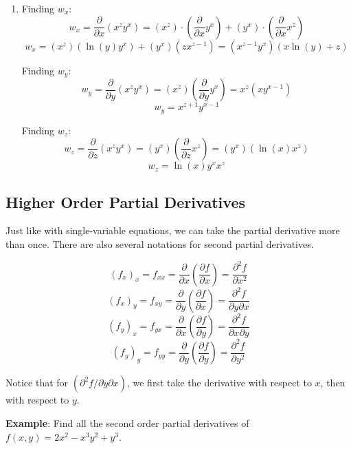 \begin{Answer}[ref = three]
\begin{enumerate}
    \item Finding $w_x$:
    $$w_x = \frac{\partial}{\partial x} \left( x^z y^x \right) = \left( x^z 
    \right) \cdot \left( \frac{\partial}{\partial x} y^x \right) + \left( y^x 
    \right) \cdot \left( \frac{\partial}{\partial x} x^z \right)$$
    $$w_x = \left(x^z \right) \left( \ln{ \left( y \right)} y^x \right) + 
    \left( y^x \right) \left(zx^{z-1} \right) = \left(x^{z-1} y^x \right) 
    \left( x\ln{\left( y \right)} + z \right)$$

    Finding $w_y$:
    $$w_y = \frac{\partial}{\partial y} \left(x^z y^x \right) = \left( x^z 
    \right) \left( \frac{\partial}{\partial y} y^x \right) = x^z \left( xy^{
    x - 1} \right)$$
    $$w_y = x^{z + 1} y^{x - 1}$$

    Finding $w_z$:
    $$w_z = \frac{\partial}{\partial z} \left( x^z y^x \right) = \left( y^x 
    \right) \left( \frac{\partial}{\partial z} x^z \right) = \left( y^x \right)
    \left( \ln{\left(x \right)} x^z \right)$$
    $$w_z = \ln{ \left(x \right)} y^x x^z$$
\end{enumerate}
\end{Answer}

\subsection{Higher Order Partial Derivatives}
Just like with single-variable equations, we can take the partial derivative 
more than once. There are also several notations for second partial derivatives.

\begin{mdframed}[style = important, frametitle = 
{Second Partial Derivative Notation}]
$$(f_x)_x = f_{xx} = \frac{\partial}{\partial x} \left( \frac{\partial f}{
\partial x} \right) = \frac{\partial^2 f}{\partial x^2}$$
$$(f_x)_y = f_{xy} = \frac{\partial}{\partial y} \left( \frac{\partial f}{
\partial x} \right) = \frac{\partial^2 f}{\partial y \partial x}$$
$$(f_y)_x = f_{yx} = \frac{\partial}{\partial x} \left( \frac{\partial f}{
\partial y} \right) = \frac{\partial^2 f}{\partial x \partial y}$$
$$(f_y)_y = f_{yy} = \frac{\partial}{\partial y} \left( \frac{\partial f}{
\partial y} \right) = \frac{\partial^2 f}{\partial y^2}$$
\end{mdframed}

Notice that for $\left( \partial^2 f / \partial y \partial x \right)$, we 
first take the derivative with respect to $x$, then with respect to $y$. 

\textbf{Example}: Find all the second order partial derivatives of $f(x, y) = 
2x^2 - x^3y^2 + y^3$.


